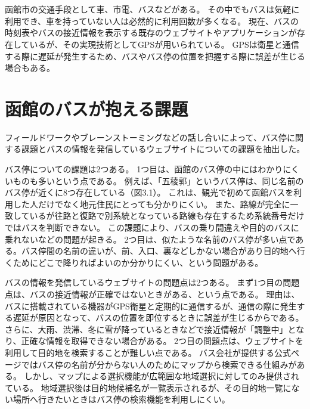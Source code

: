 \documentclass[openany,11pt,papersize]{jsbook}
\begin{document}
\section{}

函館市の交通手段として車、市電、バスなどがある。
その中でもバスは気軽に利用でき、車を持っていない人は必然的に利用回数が多くなる。
現在、バスの時刻表やバスの接近情報を表示する既存のウェブサイトやアプリケーションが存在しているが、その実現技術としてGPSが用いられている。
GPSは衛星と通信する際に遅延が発生するため、バスやバス停の位置を把握する際に誤差が生じる場合もある。


\section{函館のバスが抱える課題}

フィールドワークやブレーンストーミングなどの話し合いによって、バス停に関する課題とバスの情報を発信しているウェブサイトについての課題を抽出した。

バス停についての課題は2つある。
1つ目は、函館のバス停の中にはわかりにくいものも多いという点である。
例えば、「五稜郭」というバス停は、同じ名前のバス停が近くに8つ存在している（図3.1）。
これは、観光で初めて函館バスを利用した人だけでなく地元住民にとっても分かりにくい。
また、路線が完全に一致しているが往路と復路で別系統となっている路線も存在するため系統番号だけではバスを判断できない。
この課題により、バスの乗り間違えや目的のバスに乗れないなどの問題が起きる。
2つ目は、似たような名前のバス停が多い点である。バス停間の名前の違いが、前、入口、裏などしかない場合があり目的地へ行くためにどこで降りればよいのか分かりにくい、という問題がある。

バスの情報を発信しているウェブサイトの問題点は2つある。
まず1つ目の問題点は、バスの接近情報が正確ではないときがある、という点である。
理由は、バスに搭載されている機器がGPS衛星と定期的に通信するが、通信の際に発生する遅延が原因となって、バスの位置を即位するときに誤差が生じるからである。
さらに、大雨、渋滞、冬に雪が降っているときなどで接近情報が「調整中」となり、正確な情報を取得できない場合がある。
2つ目の問題点は、ウェブサイトを利用して目的地を検索することが難しい点である。
バス会社が提供する公式ページではバス停の名前が分からない人のためにマップから検索できる仕組みがある。
しかし、マップによる選択機能が広範囲な地域選択に対してのみ提供されている。
地域選択後は目的地候補名が一覧表示されるが、その目的地一覧にない場所へ行きたいときはバス停の検索機能を利用しにくい。
\end{document}
